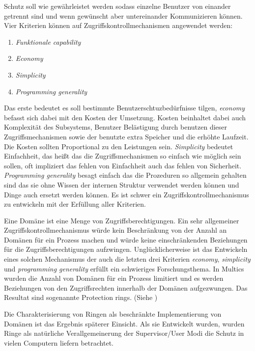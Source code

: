 \documentclass[german, 9pt,technote]{IEEEtran}
\begin{document}
        Schutz soll wie gew\"ahrleistet werden sodass einzelne Benutzer von einander getrennt sind und wenn gew\"unscht aber untereinander Kommunizieren k\"onnen.
        Vier Kriterien k\"onnen auf Zugriffskontrollmechanismen angewendet werden: 
        \begin{enumerate}
          \item \textit{Funktionale capability}
          \item \textit{Economy}
          \item \textit{Simplicity}
          \item \textit{Programming generality}
        \end{enumerate}
        Das erste bedeutet es soll bestimmte Benutzerschtuzbed\"urfnisse tilgen, \textit{economy} befasst sich dabei mit den Kosten der Umsetzung.
        Kosten beinhaltet dabei auch Komplexit\"at des Subsystems, Benutzer Bel\"astigung durch benutzen dieser Zugriffsmechanismen sowie der benutzte
        extra Speicher und die erh\"ohte Laufzeit. Die Kosten sollten Proportional zu den Leistungen sein.
        \textit{Simplicity} bedeutet Einfachheit, das hei\ss t das die Zugriffsmechanismen so einfach wie m\"oglich sein sollen, oft
        impliziert das fehlen von Einfachheit auch das fehlen von Sicherheit. \textit{Programming generality} besagt einfach das die Prozeduren so allgemein gehalten sind
        das sie ohne Wissen der internen Struktur verwendet werden k\"onnen und Dinge auch ersetzt werden k\"onnen.
        Es ist schwer ein Zugriffskontrollmechanismus zu entwickeln mit der Erf\"ullung aller Kriterien.
     
        Eine Dom\"ane ist eine Menge von Zugriffsberechtigungen. Ein sehr allgemeiner Zugriffskontrollmechanismus w\"urde kein Beschr\"ankung von der Anzahl an
        Dom\"anen f\"ur ein Prozess machen und w\"urde keine einschr\"ankenden Beziehungen f\"ur die Zugriffsberechtigungen aufzwingen.
        Ungl\"ucklicherweise ist das Entwickeln eines solchen Mechanismus der auch die letzten drei Kriterien \textit{economy}, \textit{simplicity} und \textit{programming generality}
        erf\"ullt ein schwieriges Forschungsthema.  In Multics wurden die Anzahl von Dom\"anen f\"ur ein Prozess limitiert und es werden Beziehungen von den Zugriffsrechten innerhalb
        der Dom\"anen aufgezwungen. Das Resultat sind sogenannte Protection rings. (Siehe \cite[S. 160]{inproc:protec-rings}) 
        
        Die Charakterisierung von Ringen als beschr\"ankte Implementierung von Dom\"anen ist das Ergebnis sp\"aterer Einsicht. 
        Als sie Entwickelt wurden, wurden Ringe als nat\"urliche Verallgemeinerung der Supervisor/User Modi die Schutz in vielen Computern liefern betrachtet.
    
\end{document}
